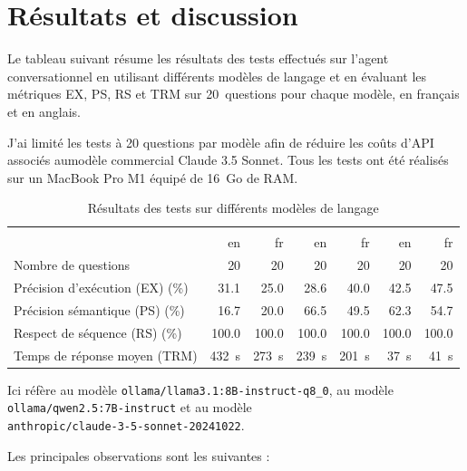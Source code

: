 \documentclass[a4paper,11pt]{article}
\begin{document}
\section{Résultats et discussion}
\label{sec:results}

Le tableau suivant résume les résultats des tests effectués sur l'agent conversationnel en utilisant différents modèles de langage et en évaluant les métriques EX, PS, RS et TRM
sur 20~questions pour chaque modèle, en français et en anglais.

J'ai limité les tests à 20 questions par modèle afin de réduire les coûts d'API associés aumodèle commercial Claude 3.5 Sonnet. Tous les tests ont été réalisés sur un MacBook Pro M1 équipé de 16~Go de RAM.


\begin{table}[h!]
\small
\centering
\begin{tabular}{l|r r|r r|r r}
\toprule
&  &  
&  \\
& {en} & {fr} & {en} & {fr} & {en} & {fr} \\
\midrule
Nombre de questions & 20 & 20 & 20 & 20 & 20 & 20 \\
Précision d'exécution (EX) (\%) & 31.1 & 25.0 & 28.6 & 40.0 & 42.5 & 47.5 \\
Précision sémantique (PS) (\%) & 16.7 & 20.0 & 66.5 & 49.5 & 62.3 & 54.7 \\
Respect de séquence (RS) (\%) & 100.0 & 100.0 & 100.0 & 100.0 & 100.0 & 100.0 \\
Temps de réponse moyen (TRM) & 432~s & 273~s & 239~s & 201~s & 37~s & 41~s \\
\bottomrule
\end{tabular}
\caption{Résultats des tests sur différents modèles de langage}
\label{tab:resultats}
\end{table}

Ici  réfère au modèle \texttt{ollama/llama3.1:8B-instruct-q8\_0}, 
 au modèle \texttt{ollama/qwen2.5:7B-instruct} et 
 au modèle \\
\texttt{anthropic/claude-3-5-sonnet-20241022}.



Les principales observations sont les suivantes :
\end{document}
